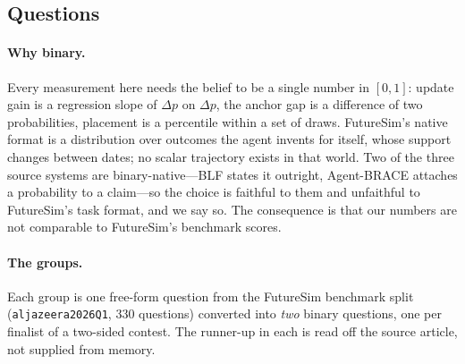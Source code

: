 \documentclass[10pt]{article}
\begin{document}
\subsection{Questions}\label{sec:questions}
\paragraph{Why binary.} Every measurement here needs the belief to be a single number in $[0,1]$:
update gain is a regression slope of $\Delta p$ on $\Delta p$, the anchor gap is a difference of two
probabilities, placement is a percentile within a set of draws. FutureSim's native format is a
distribution over outcomes the agent invents for itself, whose support changes between dates; no
scalar trajectory exists in that world. Two of the three source systems are binary-native---BLF
states it outright, Agent-BRACE attaches a probability to a claim---so the choice is faithful to
them and unfaithful to FutureSim's task format, and we say so. The consequence is that our numbers
are not comparable to FutureSim's benchmark scores.

\paragraph{The groups.} Each group is one free-form question from the FutureSim benchmark split
(\texttt{aljazeera2026Q1}, 330 questions) converted into \emph{two} binary questions, one per
finalist of a two-sided contest. The runner-up in each is read off the source article, not
supplied from memory.
\end{document}
